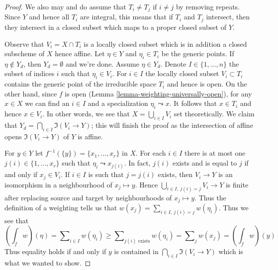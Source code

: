 \begin{proof}
\medskip\noindent
We also may and do assume that $T_i \not = T_j$ if $i \not = j$ by
removing repeats. Since $Y$ and hence all $T_i$ are integral, this
means that if $T_i$ and $T_j$ intersect, then they intersect in a
closed subset which maps to a proper closed subset of $Y$.

\medskip\noindent
Observe that $V_i = X \cap T_i$ is a locally closed subset
which is in addition a closed subscheme of $X$ hence affine.
Let $\eta \in Y$ and $\eta_i \in T_i$ be the generic points.
If $\eta \not \in Y_d$, then $Y_d = \emptyset$ and we're done.
Assume $\eta \in Y_d$. Denote $I \in \{1, \ldots, n\}$
the subset of indices $i$ such that $\eta_i \in V_i$.
For $i \in I$ the locally closed subset $V_i \subset T_i$
contains the generic point of the irreducible space $T_i$
and hence is open. On the other hand, since $f$ is open
(Lemma \ref{lemma-weighting-universally-open}),
for any $x \in X$ we can find an $i \in I$ and a specialization
$\eta_i \leadsto x$. It follows that $x \in T_i$ and hence
$x \in V_i$. In other words, we see that $X = \bigcup_{i \in I} V_i$
set theoretically.
We claim that $Y_d = \bigcap_{i \in I} \Im(V_i \to Y)$; this will
finish the proof as the intersection of affine opens
$\Im(V_i \to Y)$ of $Y$ is affine.

\medskip\noindent
For $y \in Y$ let $f^{-1}(\{y\}) = \{x_1, \ldots, x_r\}$ in $X$.
For each $i \in I$ there is at most one $j(i) \in \{1, \ldots, x_r\}$
such that $\eta_i \leadsto x_{j(i)}$. In fact, $j(i)$ exists and is
equal to $j$ if and only if $x_j \in V_i$. If $i \in I$ is such that
$j = j(i)$ exists, then $V_i \to Y$ is an isomorphism in a neighbourhood
of $x_j \mapsto y$. Hence $\bigcup_{i \in I,\ j(i) = j} V_i \to Y$
is finite after replacing source and target by neighbourhoods of
$x_j \mapsto y$. Thus the definition of a weighting tells us that
$w(x_j) = \sum_{i \in I,\ j(i) = j} w(\eta_i)$.
Thus we see that
$$
(\textstyle{\int}_f w)(\eta) =
\sum\nolimits_{i \in I} w(\eta_i) \geq
\sum\nolimits_{j(i)\text{ exists}} w(\eta_i) =
\sum\nolimits_j w(x_j) = (\textstyle{\int}_f w)(y)
$$
Thus equality holds if and only if $y$ is contained in
$\bigcap_{i \in I} \Im(V_i \to Y)$ which is what we wanted to show.
\end{proof}
